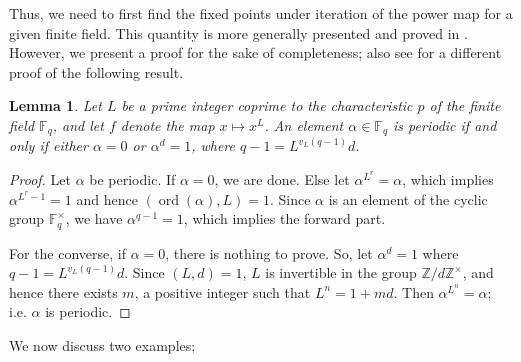 \documentclass[11pt,twoside]{amsart}
\newcommand{\Z}{\mathbb{Z}}
\newcommand{\F}{\mathbb{F}}
\newtheorem{lemma}{Lemma}[section]
\theoremstyle{definition} %
\begin{document}
Thus, we need to first find the fixed points under iteration of the power map for a given finite field. 
This quantity is more generally presented and proved in \cite[Theorem 1]{ShaHu2011}.
However, we present a proof for the sake of completeness; also see \cite[Lemma 4.2]{ManesThompson2019} for a different proof of the following result.
\begin{lemma}\label{lem:fix-field}
    Let $L$ be a prime integer coprime to the characteristic $p$ of the finite field $\F_q$, and let $f$ denote the map $x\mapsto x^L$. An element $\alpha\in \F_q$ is periodic if and only if either $\alpha=0$ or $\alpha^d=1$, where $q-1=L^{v_L(q-1)}d$.
\end{lemma}
\begin{proof}
    Let $\alpha$ be periodic. 
    If $\alpha=0$, we are done.
    Else let $\alpha^{L^r}=\alpha$, which implies $\alpha^{L^r-1}=1$ and hence $(\operatorname{ord}(\alpha),L)=1$.
    Since $\alpha$ is an element of the cyclic group $\F_q^\times$, we have $\alpha^{q-1}=1$, which implies the forward part.

    For the converse, if $\alpha=0$, there is nothing to prove. So, let $\alpha^d=1$ where $q-1=L^{v_L(q-1)}d$.
    Since $(L,d)=1$, $L$ is invertible in the group $\Z/d\Z^\times$, and hence there exists $m$, a positive integer such that $L^n=1+md$.
    Then $\alpha^{L^n}=\alpha$; i.e. $\alpha$ is periodic.
\end{proof}
We now discuss two examples; 
\end{document}
